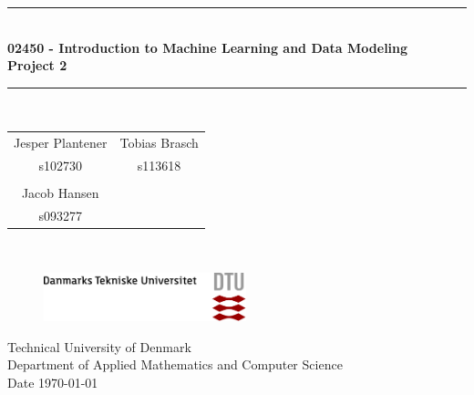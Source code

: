 \begin{titlepage}
\centering \parindent=0pt
\newcommand{\HRule}{\rule{\textwidth}{1mm}}
 \HRule\\[1cm]\Huge\bfseries
02450 - Introduction to Machine Learning and Data Modeling \\ [0.4cm] \Large Project 2\\ [0.7cm]
\HRule\\[2cm]
\large


\begin{tabular}{cc}
Jesper Plantener \qquad &  \qquad Tobias Brasch \\
s102730 & \qquad s113618 \\
\\
Jacob Hansen \\
s093277 \\
\end{tabular}\\[2cm]
 \normalsize

\begin{figure}[!h]
\raggedleft
\includegraphics[height=40pt]{pictures/DTU-logo-farve.png}
\end{figure}

\begin{flushleft}
Technical University of Denmark\\
Department of Applied Mathematics and Computer Science\\
Date \today \end{flushleft}
\end{titlepage}

